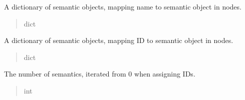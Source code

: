 \documentclass[letterpaper,10pt,english]{sphinxmanual}
\begin{document}
\begin{fulllineitems}
\begin{fulllineitems}
\begin{quote}
\begin{description}
\end{description}\end{quote}

\end{fulllineitems}


\begin{fulllineitems}
\label{\detokenize{nodes:nodes.nodeBuilder.Build_sems.name_dict}}
\pysigstartsignatures
\pysigline
{}
\pysigstopsignatures
\sphinxAtStartPar
A dictionary of semantic objects, mapping name to semantic object in nodes.
\begin{quote}\begin{description}
\sphinxAtStartPar
dict

\end{description}\end{quote}

\end{fulllineitems}


\begin{fulllineitems}
\label{\detokenize{nodes:nodes.nodeBuilder.Build_sems.id_dict}}
\pysigstartsignatures
\pysigline
{}
\pysigstopsignatures
\sphinxAtStartPar
A dictionary of semantic objects, mapping ID to semantic object in nodes.
\begin{quote}\begin{description}
\sphinxAtStartPar
dict

\end{description}\end{quote}

\end{fulllineitems}


\begin{fulllineitems}
\label{\detokenize{nodes:nodes.nodeBuilder.Build_sems.num_sems}}
\pysigstartsignatures
\pysigline
{}
\pysigstopsignatures
\sphinxAtStartPar
The number of semantics, iterated from 0 when assigning IDs.
\begin{quote}\begin{description}
\sphinxAtStartPar
int


\end{description}
\end{quote}
\end{fulllineitems}
\end{fulllineitems}
\end{document}
